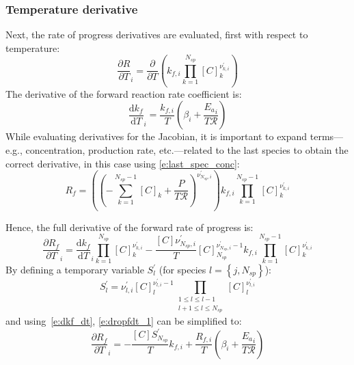 \documentclass[12pt]{article}
\newcommand{\ns}{N_{sp}}
\newcommand{\Ru}{\mathcal{R}}
\begin{document}
\subsubsection{Temperature derivative}
\label{s:dri_dt}
Next, the rate of progress derivatives are evaluated, first with respect to temperature:
\begin{equation}
 \frac{\partial R }{\partial T }_{i} = \frac{\partial}{\partial T}\left({k_{f, i}} \prod_{k=1}^{\ns} [C]_{k}^{\nu^{\prime}_{k,i}}\right)
\end{equation}
The derivative of the forward reaction rate coefficient is:
\begin{equation}
 \label{e:dkf_dt}
 \frac{\text{d} {k_f} }{\text{d} T }_{i} = \frac{{k_{f, i}}}{T} \left(\beta_{i} + \frac{{E_{a}}_{i}}{T \Ru}\right)
\end{equation}
While evaluating derivatives for the Jacobian, it is important to expand terms---e.g., concentration, production rate, etc.---related to the last species to obtain the correct derivative, in this case using \cref{e:last_spec_conc}:
\begin{equation}
 {R_f} = \left(\left(- \sum_{k=1}^{\ns  - 1} [C]_{k} + \frac{P}{T \Ru}\right)^{\nu^{\prime}_{\ns,i}}\right) {k_{f, i}} \prod_{k=1}^{\ns  - 1} [C]_{k}^{\nu^{\prime}_{k,i}}
\end{equation}

Hence, the full derivative of the forward rate of progress is:
\begin{equation}
 \label{e:dropfdt_1}
 \frac{\partial {R_f} }{\partial T }_{i} = \frac{\text{d} {k_f} }{\text{d} T }_{i} \prod_{k=1}^{\ns} [C]_{k}^{\nu^{\prime}_{k,i}} - \frac{[C] \nu^{\prime}_{\ns,i}}{T} [C]_{\ns}^{\nu^{\prime}_{\ns,i} - 1} {k_{f, i}} \prod_{k=1}^{\ns  - 1} [C]_{k}^{\nu^{\prime}_{k,i}}
\end{equation}
By defining a temporary variable $S^{\prime}_{l}$ (for species $l = \left\{j, \ns\right\}$):
\begin{equation}
 \label{e:s_temp}
 S^{\prime}_{l} = \nu^{\prime}_{l,i} [C]_{l}^{\nu^{\prime}_{l,i} - 1} \prod_{\substack{1 \leq l \leq l - 1\\l + 1 \leq l \leq \ns}} [C]_{l}^{\nu^{\prime}_{l,i}}
\end{equation}
and using~\cref{e:dkf_dt}, \cref{e:dropfdt_1} can be simplified to:
\begin{equation}
 \label{e:dropf_dt}
 \frac{\partial {R_f} }{\partial T }_{i} = - \frac{[C] S^{\prime}_{\ns}}{T} {k_{f, i}} + \frac{{R_{f, i}}}{T} \left(\beta_{i} + \frac{{E_{a}}_{i}}{T \Ru}\right)
\end{equation}
\end{document}
